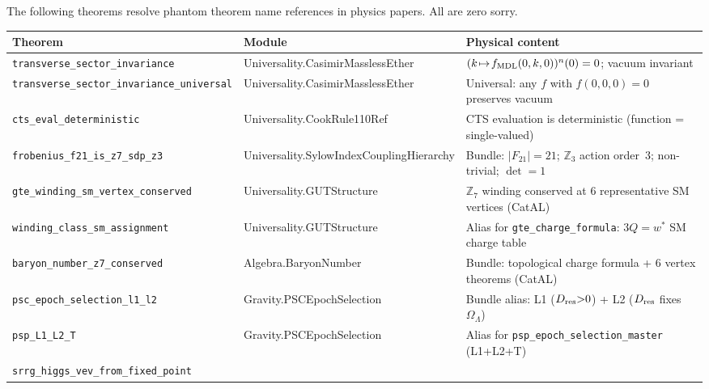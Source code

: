 \documentclass[11pt,a4paper]{article}
\theoremstyle{definition}
\begin{document}
The following theorems resolve phantom theorem name references in physics papers. All are zero sorry.

\begin{table}[h]
\centering\footnotesize
\setlength{\tabcolsep}{4pt}
\begin{tabular}{@{}p{5.2cm}p{4.4cm}p{4.4cm}@{}}
\toprule
Theorem & Module & Physical content \\
\midrule
\texttt{transverse\_\allowbreak sector\_\allowbreak invariance}
  & Universality.CasimirMasslessEther
  & $(k\!\mapsto\!f_{\rm MDL}(0,k,0))^n(0)=0$; vacuum invariant \\[1pt]
\texttt{transverse\_\allowbreak sector\_\allowbreak invariance\_\allowbreak universal}
  & Universality.CasimirMasslessEther
  & Universal: any $f$ with $f(0,0,0){=}0$ preserves vacuum \\[1pt]
\texttt{cts\_\allowbreak eval\_\allowbreak deterministic}
  & Universality.CookRule110Ref
  & CTS evaluation is deterministic (function = single-valued) \\[1pt]
\texttt{frobenius\_\allowbreak f21\_\allowbreak is\_\allowbreak z7\_\allowbreak sdp\_\allowbreak z3}
  & Universality.\allowbreak SylowIndex\allowbreak CouplingHierarchy
  & Bundle: $|F_{21}|{=}21$; $\mathbb{Z}_3$ action order~3; non-trivial; $\det{=}1$ \\[1pt]
\texttt{gte\_\allowbreak winding\_\allowbreak sm\_\allowbreak vertex\_\allowbreak conserved}
  & Universality.GUTStructure
  & $\mathbb{Z}_7$ winding conserved at 6 representative SM vertices (CatAL) \\[1pt]
\texttt{winding\_\allowbreak class\_\allowbreak sm\_\allowbreak assignment}
  & Universality.GUTStructure
  & Alias for \lstinline|gte_charge_formula|: $3Q=w^*$ SM charge table \\[1pt]
\texttt{baryon\_\allowbreak number\_\allowbreak z7\_\allowbreak conserved}
  & Algebra.BaryonNumber
  & Bundle: topological charge formula + 6 vertex theorems (CatAL) \\[1pt]
\texttt{psc\_\allowbreak epoch\_\allowbreak selection\_\allowbreak l1\_\allowbreak l2}
  & Gravity.PSCEpochSelection
  & Bundle alias: L1 ($D_{\rm res}{>}0$) + L2 ($D_{\rm res}$ fixes $\Omega_\Lambda$) \\[1pt]
\texttt{psp\_\allowbreak L1\_\allowbreak L2\_\allowbreak T}
  & Gravity.PSCEpochSelection
  & Alias for \lstinline|psp_epoch_selection_master| (L1+L2+T) \\[1pt]
\texttt{srrg\_\allowbreak higgs\_\allowbreak vev\_\allowbreak from\_\allowbreak fixed\_\allowbreak point}

\end{tabular}
\end{table}
\end{document}
